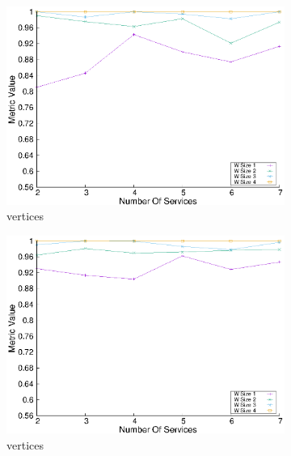 \begin{figure}[H]
\begin{subfigure}{0.45\textwidth}
    \includegraphics[width=\textwidth]{Images/graphs/window_quality_performance_diff_perce_n7_s7_20_100_n4}
    \caption{ vertices}
    \label{fig:quality_window_perce_wide_4n}
  \end{subfigure}
  \hfill
  \begin{subfigure}{0.45\textwidth}
    \includegraphics[width=\textwidth]{Images/graphs/window_quality_performance_diff_perce_n7_s7_50_89_n4}
    \caption{ vertices}
    \label{fig:quality_window_average_perce_4n}
  \end{subfigure}
  \hfill
  \begin{subfigure}{0.45\textwidth}

\end{subfigure}
\end{figure}
